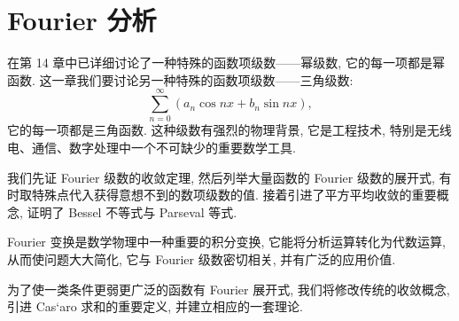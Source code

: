 
\chapter{Fourier 分析}\label{ch:16}

在第 14 章中已详细讨论了一种特殊的函数项级数——幂级数, 它的每一项都是幂函数. 这一章我们要讨论另一种特殊的函数项级数——三角级数:
\[
  \sum_{n=0}^{\infty}(a_{n}\cos nx+b_{n}\sin nx),
\]
它的每一项都是三角函数. 这种级数有强烈的物理背景, 它是工程技术, 特别是无线电、通信、数字处理中一个不可缺少的重要数学工具.

我们先证 Fourier 级数的收敛定理, 然后列举大量函数的 Fourier 级数的展开式, 有时取特殊点代入获得意想不到的数项级数的值. 接着引进了平方平均收敛的重要概念, 证明了 Bessel 不等式与 Parseval 等式.

Fourier 变换是数学物理中一种重要的积分变换, 它能将分析运算转化为代数运算, 从而使问题大大简化, 它与 Fourier 级数密切相关, 并有广泛的应用价值.

为了使一类条件更弱更广泛的函数有 Fourier 展开式, 我们将修改传统的收敛概念, 引进 Cas`aro 求和的重要定义, 并建立相应的一套理论.






